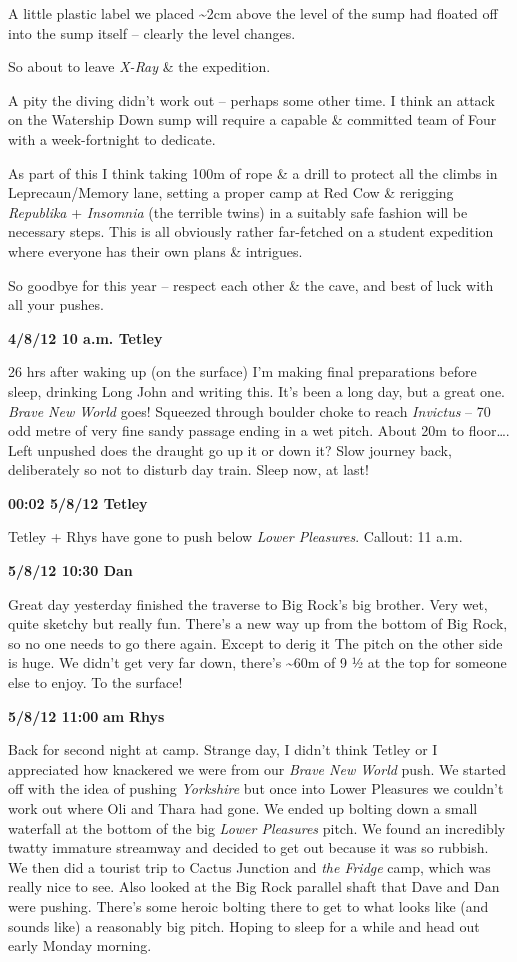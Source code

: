 A little plastic label we placed \textasciitilde{}2cm above the level of
the sump had floated off into the sump itself -- clearly the level
changes.

So about to leave \emph{X-Ray} \& the expedition.

A pity the diving didn't work out -- perhaps some other time. I think an
attack on the Watership Down sump will require a capable \& committed
team of Four with a week-fortnight to dedicate.

As part of this I think taking 100m of rope \& a drill to protect all
the climbs in Leprecaun/Memory lane, setting a proper camp at Red Cow \&
rerigging \emph{Republika} + \emph{Insomnia} (the terrible twins) in a
suitably safe fashion will be necessary steps. This is all obviously
rather far-fetched on a student expedition where everyone has their own
plans \& intrigues.

So goodbye for this year -- respect each other \& the cave, and best of
luck with all your pushes.

\textbf{4/8/12 10 a.m. Tetley}

26 hrs after waking up (on the surface) I'm making final preparations
before sleep, drinking Long John and writing this. It's been a long day,
but a great one. \emph{Brave New World} goes! Squeezed through boulder
choke to reach \emph{Invictus} -- 70 odd metre of very fine sandy
passage ending in a wet pitch. About 20m to floor\ldots{}. Left unpushed
does the draught go up it or down it? Slow journey back, deliberately so
not to disturb day train. Sleep now, at last!

\textbf{00:02 5/8/12 Tetley}

Tetley + Rhys have gone to push below \emph{Lower Pleasures}. Callout:
11 a.m.

\textbf{5/8/12 10:30 Dan}

Great day yesterday finished the traverse to Big Rock's big brother.
Very wet, quite sketchy but really fun. There's a new way up from the
bottom of Big Rock, so no one needs to go there again. Except to derig
it The pitch on the other side is huge. We didn't get very far down,
there's \textasciitilde{}60m of 9 ½ at the top for someone else to
enjoy. To the surface!

\textbf{5/8/12 11:00} \textbf{am} \textbf{Rhys}

Back for second night at camp. Strange day, I didn't think Tetley or I
appreciated how knackered we were from our \emph{Brave New World} push.
We started off with the idea of pushing \emph{Yorkshire} but once into
Lower Pleasures we couldn't work out where Oli and Thara had gone. We
ended up bolting down a small waterfall at the bottom of the big
\emph{Lower Pleasures} pitch. We found an incredibly twatty immature
streamway and decided to get out because it was so rubbish. We then did
a tourist trip to Cactus Junction and \emph{the Fridge} camp, which was
really nice to see. Also looked at the Big Rock parallel shaft that Dave
and Dan were pushing. There's some heroic bolting there to get to what
looks like (and sounds like) a reasonably big pitch. Hoping to sleep for
a while and head out early Monday morning.

